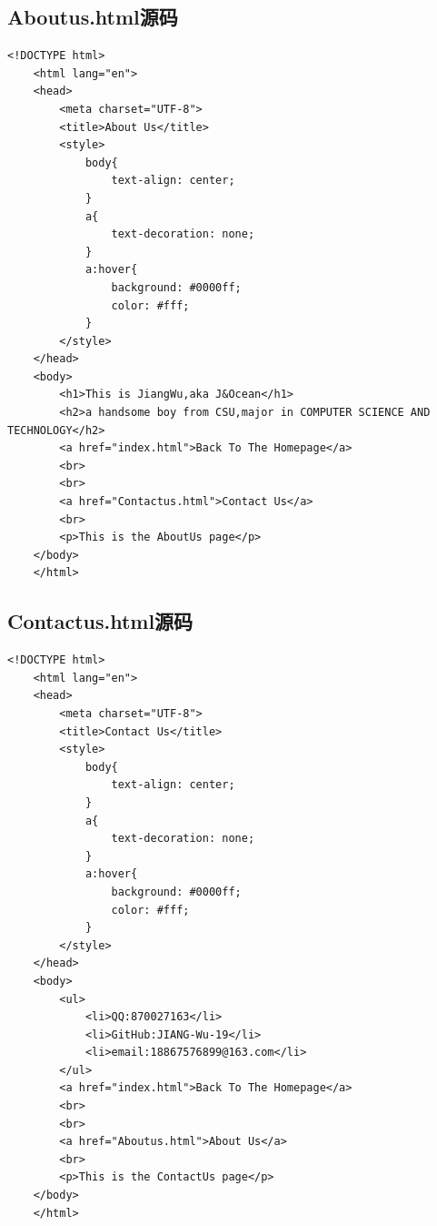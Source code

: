 \documentclass[UTF8,12pt]{article}
\begin{document}
\subsection{Aboutus.html源码}
\begin{lstlisting}[title=Aboutus.html,frame=shadowbox]
    <!DOCTYPE html>
    <html lang="en">
    <head>
        <meta charset="UTF-8">
        <title>About Us</title>
        <style>
            body{
                text-align: center;
            }
            a{
                text-decoration: none;
            }
            a:hover{
                background: #0000ff;
                color: #fff;
            }
        </style>
    </head>
    <body>
        <h1>This is JiangWu,aka J&Ocean</h1>
        <h2>a handsome boy from CSU,major in COMPUTER SCIENCE AND TECHNOLOGY</h2>
        <a href="index.html">Back To The Homepage</a>
        <br>
        <br>
        <a href="Contactus.html">Contact Us</a>
        <br>
        <p>This is the AboutUs page</p>
    </body>
    </html>
\end{lstlisting}

\subsection{Contactus.html源码}
\begin{lstlisting}[title=Contactus.html,frame=shadowbox]
    <!DOCTYPE html>
    <html lang="en">
    <head>
        <meta charset="UTF-8">
        <title>Contact Us</title>
        <style>
            body{
                text-align: center;
            }
            a{
                text-decoration: none;
            }
            a:hover{
                background: #0000ff;
                color: #fff;
            }
        </style>
    </head>
    <body>
        <ul>
            <li>QQ:870027163</li>
            <li>GitHub:JIANG-Wu-19</li>
            <li>email:18867576899@163.com</li>
        </ul>
        <a href="index.html">Back To The Homepage</a>
        <br>
        <br>
        <a href="Aboutus.html">About Us</a>
        <br>
        <p>This is the ContactUs page</p>
    </body>
    </html>
\end{lstlisting}
\end{document}
